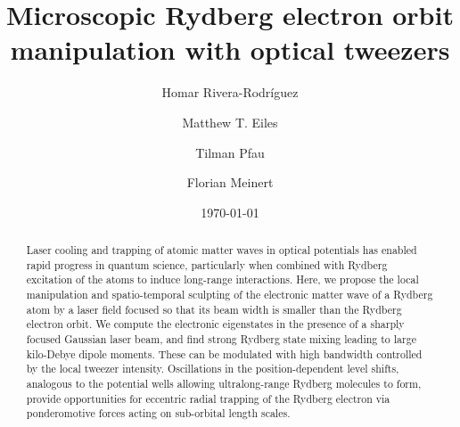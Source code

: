 \documentclass[aps,prl,groupedaddress,superscriptaddress,twocolumn,10pt,longbibliography]{revtex4-2}
\author{#1}
\begin{document}
\title{Microscopic Rydberg electron orbit manipulation with optical tweezers}

\author{Homar Rivera-Rodr\'iguez }

\author{Matthew T. Eiles}

\author{Tilman Pfau}

\author{Florian Meinert}

\date{\today}

\begin{abstract}
Laser cooling and trapping of atomic matter waves in optical potentials has enabled
rapid progress in quantum science, particularly when combined with Rydberg excitation of the
atoms to induce long-range interactions. Here, we propose the local manipulation and spatio-temporal sculpting
of the electronic matter wave of a Rydberg atom by a laser field focused so that its beam width
is smaller than the Rydberg electron orbit.
We compute the electronic eigenstates in the presence of a sharply focused Gaussian laser beam, and find strong Rydberg state mixing leading to large kilo-Debye dipole moments.
These can be modulated with high bandwidth controlled by the local tweezer intensity.
Oscillations in the position-dependent level shifts, analogous to the potential wells allowing ultralong-range Rydberg molecules to form, provide opportunities for eccentric radial trapping of the Rydberg electron via ponderomotive forces acting on sub-orbital length scales.
\end{abstract}

\maketitle
\end{document}
